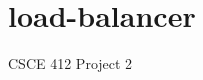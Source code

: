 \chapter{load-\/balancer}
\hypertarget{md__r_e_a_d_m_e}{}\label{md__r_e_a_d_m_e}
\label{md__r_e_a_d_m_e_autotoc_md0}%
%
CSCE 412 Project 2 